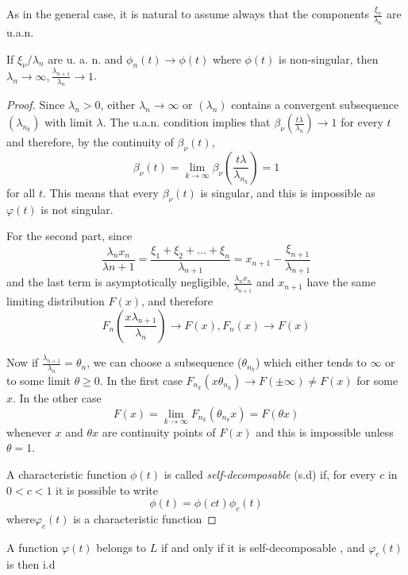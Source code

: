  As in the general case, it is natural to assume always that the
 components $\frac{\xi _\nu}{\lambda_n}$ are u.a.n. 

 \begin{theorem}\label{chap2:sec11:thm39} %
 If $\xi_ \nu/\lambda_n$ are u.  a.  n.  and $\phi_n (t) \rightarrow
 \phi (t)$ where $\phi (t)$ is non-singular, then $\lambda_n \rightarrow
 \infty, \frac{\lambda_{n+1}}{\lambda_n}\rightarrow 1$.  
 \end{theorem}

\begin{proof}
Since $\lambda_n> 0$, either $\lambda_n \rightarrow \infty$ or
$(\lambda_n)$ contains a convergent subsequence $(\lambda_{n_k})$
with limit $\lambda$.  The u.a.n. condition implies that $\beta_
\nu\left(\frac{t \lambda}{\lambda_n}\right) \rightarrow 1$ for every $t$ and
therefore, by the continuity of $\beta_\nu (t)$, 
 $$
\beta_\nu(t) = \lim\limits_{k \rightarrow \infty}\beta_\nu
\left(\frac{t\lambda}{\lambda_{n_k}}\right) = 1
$$\pageoriginale 
for all $t$.  This means that every $\beta_\nu (t)$ is singular, and
this is impossible as $\varphi (t)$ is not singular. 
 
For the second part, since
 $$
\frac{\lambda_nx_n}{\lambda{n+1}}=
\frac{\xi_1+\xi_2+\dots+\xi_n}{\lambda_{n+1}} =
 x_{n+1}-\frac{\xi_{n+1}}{\lambda_{n+1}}   
 $$
 and the last term is asymptotically negligible, $\frac{\lambda_n
   x_n}{\lambda_{n+1}}$ and $x_{n+1}$ 
 have the same limiting distribution $F(x)$, and therefore 
  $$
 F_n \left(\frac{x \lambda_{n+1}}{\lambda_n}\right) \rightarrow F(x), F_n(x)
 \rightarrow F(x)
 $$

 Now if $\frac{\lambda_{n+1}}{\lambda_n} = \theta_n$, we can choose a
 subsequence ($\theta_{n_k}$) which either tends to $\infty$ or to some
 limit $\theta \ge 0$. In the first case  
 $F_{n_k} (x \theta_{n_k}) \rightarrow F (\pm \infty) \neq F(x)$
 for some $x$. In the other case 
  $$
 F(x) = \lim\limits_{k \rightarrow \infty} F_{n_k} (\theta_{n_k}
 x)=F(\theta x)
 $$ 
 whenever $x$ and $\theta x$ are continuity points of $F(x)$ and this is
 impossible unless $\theta = 1$. 
 
 A characteristic function $\phi (t)$ is called \textit{self-decomposable}
 (s.d) if, for every $c$ in $0 < c < 1$ it is possible to write  
 $$
 \phi(t) = \phi(ct) \phi_c (t)
 $$
 where\pageoriginale $\varphi_c (t)$ is a characteristic function
\end{proof}

 \begin{theorem}[P.L\'evy]\label{chap2:sec11:thm40} %
   A function $\varphi (t)$ belongs to $L$ if and only
   if it is self-decomposable , and $\varphi_c (t)$ is then i.d 
 \end{theorem}


